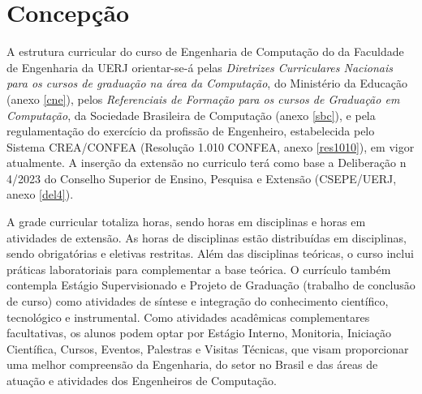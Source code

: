 \section{Concepção}

A estrutura curricular do curso de Engenharia de Computação do \desc da Faculdade de Engenharia da UERJ orientar-se-á pelas \textit{Diretrizes Curriculares Nacionais para os cursos de graduação na área da Computação}, do Ministério da Educação (anexo \ref{cne}), pelos \textit{Referenciais de Formação para os cursos de Graduação em Computação}, da Sociedade Brasileira de Computação (anexo \ref{sbc}), e pela regulamentação do exercício da profissão de Engenheiro, estabelecida pelo Sistema CREA/CONFEA (Resolução 1.010 CONFEA, anexo \ref{res1010}), em vigor atualmente. A inserção da extensão no curriculo terá como base a Deliberação n\textordmasculine{} 4/2023 do Conselho Superior de Ensino, Pesquisa e Extensão (CSEPE/UERJ, anexo \ref{del4}).

A grade curricular totaliza \totalhoras horas, sendo \hobrigatorias horas em disciplinas e \hextensao horas em atividades de extensão. As \hobrigatorias horas de disciplinas estão distribuídas em \ndisciplinas disciplinas, sendo \nobrigatorias  obrigatórias e \neletivas eletivas restritas. Além das disciplinas teóricas, o curso inclui práticas laboratoriais para complementar a base teórica. O currículo também contempla Estágio Supervisionado e Projeto de Graduação (trabalho de conclusão de curso) como atividades de síntese e integração do conhecimento científico, tecnológico e instrumental. Como atividades acadêmicas complementares facultativas, os alunos podem optar por Estágio Interno, Monitoria, Iniciação Científica, Cursos, Eventos, Palestras e Visitas Técnicas, que visam proporcionar uma melhor compreensão da Engenharia, do setor no Brasil e das áreas de atuação e atividades dos Engenheiros de Computação.
